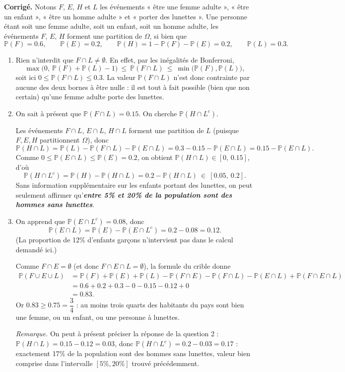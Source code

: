 \documentclass[12pt,a4paper]{article}
\newcommand{\bemph}[1]{\textbf{\textcolor{myblue}{\emph{#1}}}}
\renewcommand{\P}{\mathbb{P}}
\renewcommand{\leq}{\leqslant}
\renewcommand{\geq}{\geqslant}
\newenvironment{corrige}{\par\smallskip\noindent\textbf{Corrigé.} }{\par\medskip}
\begin{document}
\begin{corrige}
Notons $F$, $E$, $H$ et $L$ les événements « être une femme adulte », « être un enfant »,
« être un homme adulte » et « porter des lunettes ». Une personne étant soit une femme
adulte, soit un enfant, soit un homme adulte, les événements $F$, $E$, $H$ forment une
partition de $\Omega$, si bien que
\[
\P(F)=0.6,\qquad \P(E)=0.2,\qquad \P(H)=1-\P(F)-\P(E)=0.2,\qquad \P(L)=0.3.
\]

\begin{enumerate}
\item Rien n'interdit que $F\cap L\neq\emptyset$. En effet, par les inégalités de
Bonferroni,
\[
\max\bigl(0,\ \P(F)+\P(L)-1\bigr)\ \leq\ \P(F\cap L)\ \leq\ \min\bigl(\P(F),\P(L)\bigr),
\]
soit ici $0\leq \P(F\cap L)\leq 0.3$. La valeur $\P(F\cap L)$ n'est donc contrainte par
aucune des deux bornes à être nulle : il est tout à fait possible (bien que non certain)
qu'une femme adulte porte des lunettes.

\item On sait à présent que $\P(F\cap L)=0.15$. On cherche $\P(H\cap L^c)$.

Les événements $F\cap L$, $E\cap L$, $H\cap L$ forment une partition de $L$ (puisque $F,E,H$
partitionnent $\Omega$), donc
\[
\P(H\cap L)=\P(L)-\P(F\cap L)-\P(E\cap L)=0.3-0.15-\P(E\cap L)=0.15-\P(E\cap L).
\]
Comme $0\leq \P(E\cap L)\leq \P(E)=0.2$, on obtient $\P(H\cap L)\in[0,\,0.15]$, d'où
\[
\P(H\cap L^c)=\P(H)-\P(H\cap L)=0.2-\P(H\cap L)\ \in\ [0.05,\ 0.2].
\]
Sans information supplémentaire sur les enfants portant des lunettes, on peut seulement
affirmer qu'\bemph{entre 5\% et 20\% de la population sont des hommes sans lunettes}.

\item On apprend que $\P(E\cap L^c)=0.08$, donc
\[
\P(E\cap L)=\P(E)-\P(E\cap L^c)=0.2-0.08=0.12.
\]
(La proportion de 12\% d'enfants garçons n'intervient pas dans le calcul demandé ici.)

Comme $F\cap E=\emptyset$ (et donc $F\cap E\cap L=\emptyset$), la formule du crible donne
\begin{align*}
\P(F\cup E\cup L)
&=\P(F)+\P(E)+\P(L)-\P(F\cap E)-\P(F\cap L)-\P(E\cap L)+\P(F\cap E\cap L)\\
&=0.6+0.2+0.3-0-0.15-0.12+0\\
&=0.83.
\end{align*}
Or $0.83\geq 0.75=\dfrac{3}{4}$ : au moins trois quarts des habitants du pays sont bien une
femme, ou un enfant, ou une personne à lunettes.

\emph{Remarque.} On peut à présent préciser la réponse de la question 2 :
$\P(H\cap L)=0.15-0.12=0.03$, donc $\P(H\cap L^c)=0.2-0.03=0.17$ : exactement 17\% de la
population sont des hommes sans lunettes, valeur bien comprise dans l'intervalle
$[5\%,20\%]$ trouvé précédemment.
\end{enumerate}
\end{corrige}
\vspace{0.15cm}
\end{document}
